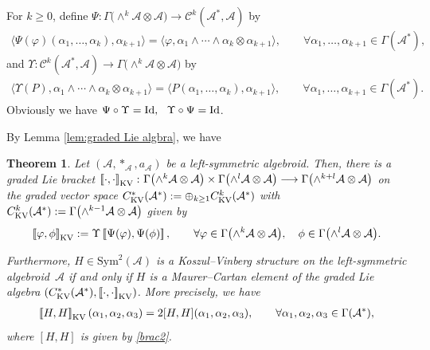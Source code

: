 \documentclass[10pt,a4paper]{amsart}
\numberwithin{equation}{section}
\newtheorem{thm}{Theorem}[section]
\newcommand{\huaA}{\mathcal{A}}
\newcommand{\huaC}{\mathcal{C}}
\newcommand{\Courant}[1]{\left[\!\left[ #1\right]\!\right]}
\newcommand{\Id}{\rm{Id}}
\newcommand{\Sym}{\mathrm{Sym}}
\begin{document}
For $k\geq0$, define $\Psi\colon \Gamma\big({\wedge}^{k}\huaA\otimes \huaA\big)\longrightarrow\huaC^k(\huaA^*,\huaA) $ by
\begin{gather}\label{eq:relation-coboundary} \langle\Psi(\varphi)(\alpha_1,\dots,\alpha_k),\alpha_{k+1}\rangle =\langle\varphi,\alpha_1\wedge\cdots\wedge\alpha_k\otimes\alpha_{k+1}\rangle,\qquad
\forall \alpha_1,\dots,\alpha_{k+1}\in\Gamma(\huaA^*),
\end{gather}
and $\Upsilon\colon \huaC^k(\huaA^*,\huaA) \longrightarrow \Gamma\big({\wedge}^{k}\huaA\otimes \huaA\big)$ by
\begin{gather*}%
\langle \Upsilon(P),\alpha_1\wedge\cdots\wedge\alpha_k\otimes\alpha_{k+1}\rangle=\langle P(\alpha_1,\dots,\alpha_k),\alpha_{k+1}\rangle,\qquad
\forall \alpha_1,\dots,\alpha_{k+1}\in\Gamma(\huaA^*).
\end{gather*}
Obviously we have $\Psi\circ\Upsilon={\Id},~~\Upsilon\circ\Psi={\Id}$.


By Lemma \ref{lem:graded Lie algbra}, we have
\begin{thm}
Let $(\huaA,\ast_\huaA,a_\huaA)$ be a left-symmetric algebroid. Then, there is a graded Lie bracket $\Courant{\cdot,\cdot}_{\rm KV}\colon \Gamma\big({\wedge}^{k}\huaA\otimes \huaA\big)\times \Gamma\big({\wedge}^{l}\huaA\otimes \huaA\big)\longrightarrow \Gamma\big({\wedge}^{k+l}\huaA\otimes \huaA\big)$ on the graded vector space $C_{\rm KV}^{*}(\huaA^*):=\oplus_{k\ge 1}C_{\rm KV}^{k}(\huaA^*)$ with $C_{\rm KV}^{k}(\huaA^*):=\Gamma\big({\wedge}^{k-1}\huaA\otimes \huaA\big)$ given by
\begin{gather*}
\Courant{\varphi,\phi}_{\rm KV}:=\Upsilon\Courant{\Psi(\varphi),\Psi(\phi)},\qquad
\forall \varphi\in\Gamma\big({\wedge}^{k}\huaA\otimes \huaA\big),\quad\phi\in\Gamma\big({\wedge}^{l}\huaA\otimes \huaA\big).
\end{gather*}

Furthermore, $H\in \Sym^2(\huaA)$ is a Koszul--Vinberg structure on the left-symmetric algebroid~$\huaA$ if and only if $H$ is a Maurer--Cartan element of the graded Lie algebra $(C_{\rm KV}^{*}(\huaA^*),\Courant{\cdot,\cdot}_{\rm KV})$. More precisely, we have
 \begin{gather*}
\Courant{H,H}_{\rm KV}(\alpha_1,\alpha_2,\alpha_3)=2[H,H](\alpha_1,\alpha_2,\alpha_3),\qquad \forall \alpha_1,\alpha_2,\alpha_3\in\Gamma(\huaA^*),
 \end{gather*}
 where $[H,H]$ is given by \eqref{brac2}.
\end{thm}
\end{document}
